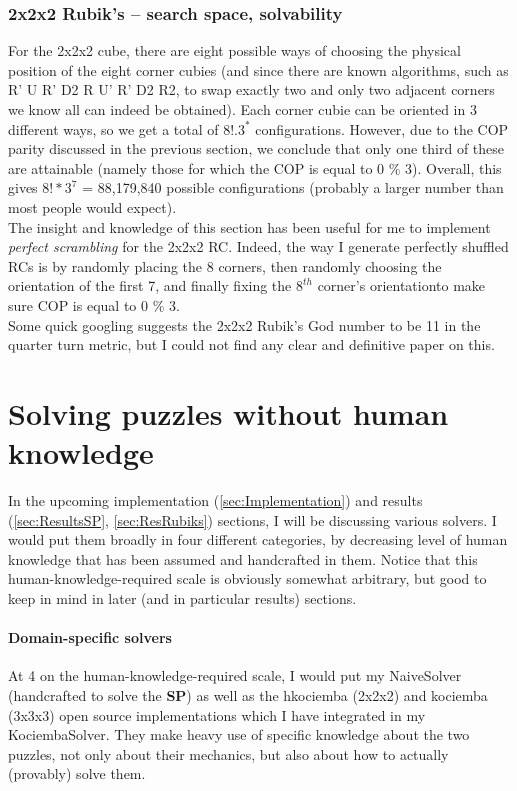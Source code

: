 \subsubsection{2x2x2 Rubik's -- search space, solvability}

For the 2x2x2 cube, there are eight possible ways of choosing the physical position of the eight corner cubies (and since there are known algorithms, such as R’ U R’ D2 R U’ R’ D2 R2, to swap exactly two and only two adjacent corners we know all can indeed be obtained). Each corner cubie can be oriented in 3 different ways, so we get a total of $8! . 3^{*}$ configurations. However, due to the COP parity discussed in the previous section, we conclude that only one third of these are attainable (namely those for which the COP is equal to 0 \% 3). Overall, this gives $8! * 3^{7}$ = 88,179,840 possible configurations (probably a larger number than most people would expect).
\\
The insight and knowledge of this section has been useful for me to implement \textit{perfect scrambling} for the 2x2x2 RC. Indeed, the way I generate perfectly shuffled RCs is by randomly placing the 8 corners, then randomly choosing the orientation of the first 7, and finally fixing the $8^{th}$ corner's orientationto make sure COP is equal to 0 \% 3.
\\
Some quick googling suggests the 2x2x2 Rubik's God number to be 11 in the quarter turn metric, but I could not find any clear and definitive paper on this.



\section{Solving puzzles without human knowledge}
\label{sec:WHK}

In the upcoming implementation (\ref{sec:Implementation}) and results (\ref{sec:ResultsSP}, \ref{sec:ResRubiks}) sections, I will be discussing various solvers. I would put them broadly in four different categories, by decreasing level of human knowledge that has been assumed and handcrafted in them. Notice that this human-knowledge-required scale is obviously somewhat arbitrary, but good to keep in mind in later (and in particular results) sections.

\paragraph{Domain-specific solvers}
At 4 on the human-knowledge-required scale, I would put my NaiveSolver (handcrafted to solve the \textbf{SP}) as well as the hkociemba (2x2x2) and kociemba (3x3x3) open source implementations which I have integrated in my KociembaSolver. They make heavy use of specific knowledge about the two puzzles, not only about their mechanics, but also about how to actually (provably) solve them.


